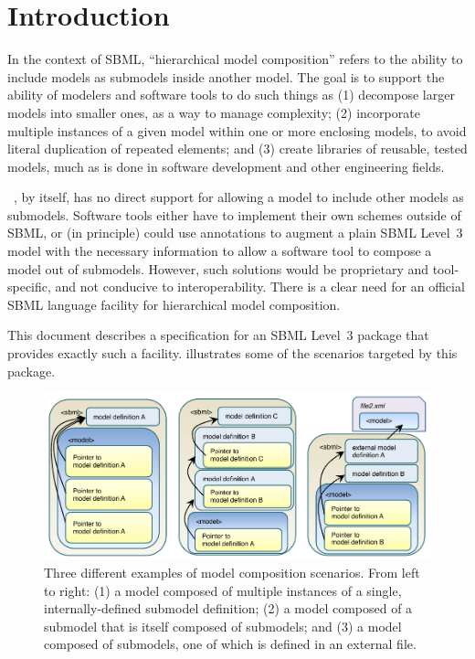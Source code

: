 
\section{Introduction}
\label{intro}

In the context of SBML, ``hierarchical model composition'' refers to the ability to include models as submodels inside another model. The goal is to support the ability of modelers and software tools to do such things as (1) decompose larger models into smaller ones, as a way to manage complexity; (2) incorporate multiple instances of a given model within one or more enclosing models, to avoid literal duplication of repeated elements; and (3) create libraries of reusable, tested models, much as is done in software development and other engineering fields.

~\citep{l3v1c}, by itself, has no direct support for allowing a model to include other models as submodels. Software tools either have to implement their own schemes outside of SBML, or (in principle) could use annotations to augment a plain SBML Level~3 model with the necessary information to allow a software tool to compose a model out of submodels.  However, such solutions would be proprietary and tool-specific, and not conducive to interoperability. There is a clear need for an official SBML language facility for hierarchical model composition.

This document describes a specification for an SBML Level~3 package that provides exactly such a facility.   illustrates some of the scenarios targeted by this package. 

\begin{figure}[hb]
  \includegraphics{figs/figure1}
  \caption{Three different examples of model composition scenarios. From left to right: (1) a model composed of multiple instances of a single, internally-defined submodel definition; (2) a model composed of a submodel that is itself composed of submodels; and (3) a model composed of submodels, one of which is defined in an external file.}
  \label{fig1}
\end{figure}

